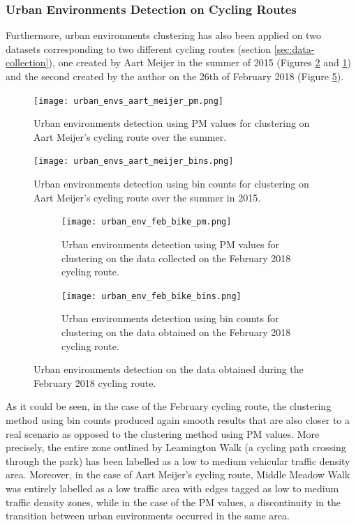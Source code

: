 \documentclass[bsc,frontabs,twoside,singlespacing, parskip,deptreport]{infthesis}     %
\begin{document}
\subsubsection*{Urban Environments Detection on Cycling Routes}

Furthermore, urban environments clustering has also been applied on two datasets corresponding to two different cycling routes (section \ref{sec:data-collection}), one created by Aart Meijer in the summer of 2015 (Figures \ref{fig:meijer-bike-urban-envs-bins} and \ref{fig:meijer-bike-urban-envs-pm}) and the second created by the author on the 26th of February 2018 (Figure \ref{fig:feb-bike-urban-envs}).

\begin{figure}[h!]
    \texttt{[image: urban\_envs\_aart\_meijer\_pm.png]}
    \caption{Urban environments detection using PM values for clustering on Aart Meijer's cycling route over the summer.}
    \label{fig:meijer-bike-urban-envs-pm}
\end{figure}

\begin{figure}
    \texttt{[image: urban\_envs\_aart\_meijer\_bins.png]}
    \caption{Urban environments detection using bin counts for clustering on Aart Meijer's cycling route over the summer in 2015.}
    \label{fig:meijer-bike-urban-envs-bins}
\end{figure}

\begin{figure}[h!]
  \begin{subfigure}[t]{\textwidth}
    \texttt{[image: urban\_env\_feb\_bike\_pm.png]}
    \caption{Urban environments detection using PM values for clustering on the data collected on the February 2018 cycling route.}
    \label{fig:feb-bike-urban-envs-pm}
  \end{subfigure}
  \hfill
  \begin{subfigure}[t]{\textwidth}
    \texttt{[image: urban\_env\_feb\_bike\_bins.png]}
    \caption{Urban environments detection using bin counts for clustering on the data obtained on the February 2018 cycling route.}
    \label{fig:feb-bike-urban-envs-bins}
  \end{subfigure}
  \caption{Urban environments detection on the data obtained during the February 2018 cycling route.}
  \label{fig:feb-bike-urban-envs}
\end{figure}

As it could be seen, in the case of the February cycling route, the clustering method using bin counts produced again smooth results that are also closer to a real scenario as opposed to the clustering method using PM values. More precisely, the entire zone outlined by Leamington Walk (a cycling path crossing through the park) has been labelled as a low to medium vehicular traffic density area. Moreover, in the case of Aart Meijer's cycling route, Middle Meadow Walk was entirely labelled as a low traffic area with edges tagged as low to medium traffic density zones, while in the case of the PM values, a discontinuity in the transition between urban environments occurred in the same area.
\end{document}
